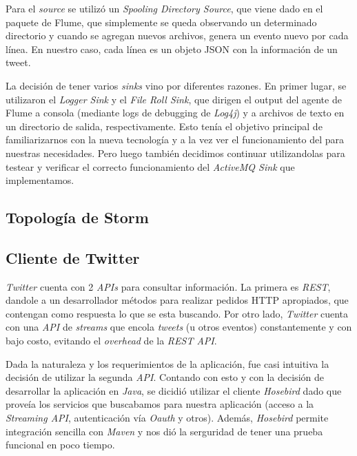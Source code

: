 \documentclass[a4paper,10pt]{article}
\begin{document}
Para el \textit{source} se utilizó un \textit{Spooling Directory Source}, que viene dado en el paquete de Flume, que simplemente se queda observando un
determinado directorio y cuando se agregan nuevos archivos, genera un evento nuevo por cada línea. En nuestro caso, cada línea es un objeto JSON con la información de un tweet.

La decisión de tener varios \textit{sinks} vino por diferentes razones. En primer lugar, se utilizaron el \textit{Logger Sink} y el \textit{File Roll Sink}, que dirigen el output
del agente de Flume a consola (mediante logs de debugging de \textit{Log4j}) y a archivos de texto en un directorio de salida, respectivamente. Esto tenía el objetivo principal de
familiarizarnos con la nueva tecnología y a la vez ver el funcionamiento del  para nuestras necesidades. Pero luego también decidimos continuar
utilizandolas para testear y verificar el correcto funcionamiento del \textit{ActiveMQ Sink} que implementamos.

\subsection{Topología de Storm}

\subsection{Cliente de Twitter}

\textit{Twitter} cuenta con 2 \textit{APIs} para consultar información. La primera es \textit{REST}, dandole a un desarrollador métodos para realizar pedidos HTTP apropiados,
que contengan como respuesta lo que se esta buscando. Por otro lado, \textit{Twitter} cuenta con una \textit{API} de \textit{streams} que encola \textit{tweets} (u otros eventos)
constantemente y con bajo costo, evitando el \textit{overhead} de la \textit{REST API}.

Dada la naturaleza y los requerimientos de la aplicación, fue casi intuitiva la decisión de utilizar la segunda \textit{API}. Contando con esto y con la decisión de desarrollar
la aplicación en \textit{Java}, se dicidió utilizar el cliente \textit{Hosebird} dado que proveía los servicios que buscabamos para nuestra aplicación (acceso a la
\textit{Streaming API}, autenticación vía \textit{Oauth} y otros). Además, \textit{Hosebird} permite integración sencilla con \textit{Maven} y nos dió la serguridad de tener
una prueba funcional en poco tiempo.
\end{document}
